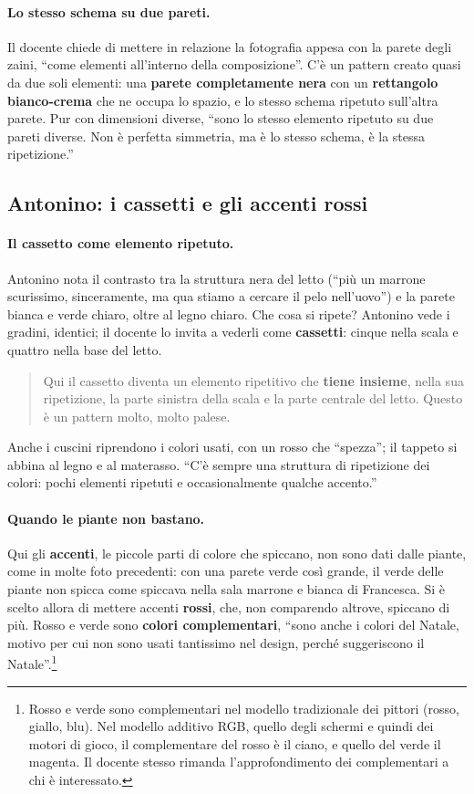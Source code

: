 \paragraph{Lo stesso schema su due pareti.} Il docente chiede di mettere in relazione la
fotografia appesa con la parete degli zaini, ``come elementi all'interno della
composizione''. C'è un pattern creato quasi da due soli elementi: una \textbf{parete
completamente nera} con un \textbf{rettangolo bianco-crema} che ne occupa lo spazio, e lo
stesso schema ripetuto sull'altra parete. Pur con dimensioni diverse, ``sono lo stesso
elemento ripetuto su due pareti diverse. Non è perfetta simmetria, ma è lo stesso schema,
è la stessa ripetizione.''

\subsection{Antonino: i cassetti e gli accenti rossi}

\paragraph{Il cassetto come elemento ripetuto.} Antonino nota il contrasto tra la
struttura nera del letto (``più un marrone scurissimo, sinceramente, ma qua stiamo a
cercare il pelo nell'uovo'') e la parete bianca e verde chiaro, oltre al legno chiaro.
Che cosa si ripete? Antonino vede i gradini, identici; il docente lo invita a vederli come
\textbf{cassetti}: cinque nella scala e quattro nella base del letto.
\begin{quote}
Qui il cassetto diventa un elemento ripetitivo che \textbf{tiene insieme}, nella sua
ripetizione, la parte sinistra della scala e la parte centrale del letto. Questo è un
pattern molto, molto palese.
\end{quote}
Anche i cuscini riprendono i colori usati, con un rosso che ``spezza''; il tappeto si
abbina al legno e al materasso. ``C'è sempre una struttura di ripetizione dei colori: pochi
elementi ripetuti e occasionalmente qualche accento.''

\paragraph{Quando le piante non bastano.} Qui gli \textbf{accenti}, le piccole parti di
colore che spiccano, non sono dati dalle piante, come in molte foto precedenti: con una
parete verde così grande, il verde delle piante non spicca come spiccava nella sala
marrone e bianca di Francesca. Si è scelto allora di mettere accenti \textbf{rossi}, che,
non comparendo altrove, spiccano di più. Rosso e verde sono \textbf{colori
complementari}, ``sono anche i colori del Natale, motivo per cui non sono usati
tantissimo nel design, perché suggeriscono il Natale''.\footnote{Rosso e verde sono
complementari nel modello tradizionale dei pittori (rosso, giallo, blu). Nel modello
additivo RGB, quello degli schermi e quindi dei motori di gioco, il complementare del
rosso è il ciano, e quello del verde il magenta. Il docente stesso rimanda
l'approfondimento dei complementari a chi è interessato.}

